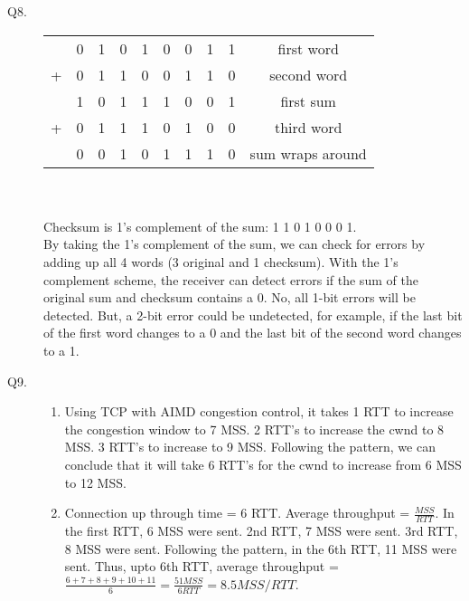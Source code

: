 \documentclass{csc_assignment}
\begin{document}
\begin{description}

\item[Q8.]
\begin{tabular}{ cccccccccc }
	& 0 & 1 & 0 & 1 & 0 & 0 & 1 & 1 & first word \\
	+ & 0 & 1 & 1 & 0 & 0 & 1 & 1 & 0 & second word \\
	\hline
	& 1 & 0 & 1 & 1 & 1 & 0 & 0 & 1 & first sum \\
	+ & 0& 1 & 1 & 1 & 0 & 1 & 0 & 0 & third word \\
	\hline
	& 0 & 0& 1 & 0 & 1 & 1 & 1 & 0 & sum wraps around \\
	\hline
\end{tabular} \\\\
Checksum is 1's complement of the sum: 1 1 0 1 0 0 0 1. \\
By taking the 1's complement of the sum, we can check for errors by adding up all 4 words (3 original and 1 checksum). With the 1's complement scheme, the receiver can detect errors if the sum of the original sum and checksum contains a 0. No, all 1-bit errors will be detected. But, a 2-bit error could be undetected, for example, if the last bit of the first word changes to a 0 and the last bit of the second word changes to a 1.


\item[Q9.]
\begin{enumerate}
\item Using TCP with AIMD congestion control, it takes 1 RTT to increase the congestion window to 7 MSS. 2 RTT's to increase the cwnd to 8 MSS. 3 RTT's to increase to 9 MSS. Following the pattern, we can conclude that it will take 6 RTT's for the cwnd to increase from 6 MSS to 12 MSS.
\item Connection up through time = 6 RTT. Average throughput = $\frac{MSS}{RTT}$. In the first RTT, 6 MSS were sent. 2nd RTT, 7 MSS were sent. 3rd RTT, 8 MSS were sent. Following the pattern, in the 6th RTT, 11 MSS were sent. Thus, upto 6th RTT, average throughput = $\frac{6+7+8+9+10+11}{6} = \frac{51 MSS}{6 RTT} = 8.5 MSS/RTT$.
\end{enumerate}



\end{description}
\end{document}
